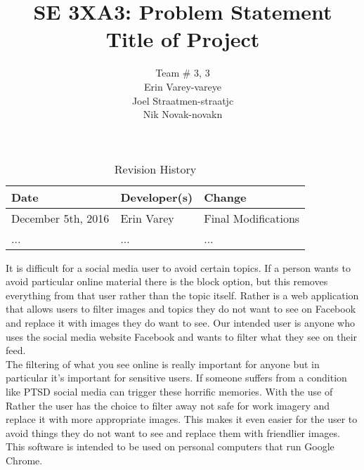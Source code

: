 \documentclass{article}
\title{SE 3XA3: Problem Statement\\Title of Project}
\author{Team \# 3, 3
		\\ Erin Varey-vareye
		\\ Joel Straatmen-straatjc
		\\ Nik Novak-novakn
}
\date{}
\begin{document}
\begin{table}[hp]
\caption{Revision History} \label{TblRevisionHistory}
\begin{tabularx}{\textwidth}{llX}
\toprule
\textbf{Date} & \textbf{Developer(s)} & \textbf{Change}\\
\midrule
December 5th, 2016 & Erin Varey & Final Modifications\\
... & ... & ...\\
\bottomrule
\end{tabularx}
\end{table}

\newpage

\maketitle

	It is difficult for a social media user to avoid certain topics. If a person wants to avoid particular online material there is the block option, but this removes everything from that user rather than the topic itself. Rather is a web application that allows users to filter images and topics they do not want to see on Facebook and replace it with images they do want to see. Our intended user is anyone who uses the social media website Facebook and wants to filter what they see on their feed. \\
The filtering of what you see online is really important for anyone but in particular it’s important for sensitive users. If someone suffers from a condition like PTSD social media can trigger these horrific memories. With the use of Rather the user has the choice to filter away not safe for work imagery and replace it with more appropriate images. This makes it even easier for the user to avoid things they do not want to see and replace them with friendlier images.  This software is intended to be used on personal computers that run Google Chrome. 
\end{document}
